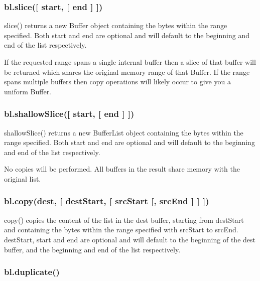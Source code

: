  \label{_slice}%
 \subsubsection*{bl.\+slice(\mbox{[} start, \mbox{[} end \mbox{]} \mbox{]})}

{\ttfamily slice()} returns a new {\ttfamily Buffer} object containing the bytes within the range specified. Both {\ttfamily start} and {\ttfamily end} are optional and will default to the beginning and end of the list respectively.

If the requested range spans a single internal buffer then a slice of that buffer will be returned which shares the original memory range of that Buffer. If the range spans multiple buffers then copy operations will likely occur to give you a uniform Buffer. 

 \label{_shallowSlice}%
 \subsubsection*{bl.\+shallow\+Slice(\mbox{[} start, \mbox{[} end \mbox{]} \mbox{]})}

{\ttfamily shallow\+Slice()} returns a new {\ttfamily Buffer\+List} object containing the bytes within the range specified. Both {\ttfamily start} and {\ttfamily end} are optional and will default to the beginning and end of the list respectively.

No copies will be performed. All buffers in the result share memory with the original list. 

 \label{_copy}%
 \subsubsection*{bl.\+copy(dest, \mbox{[} dest\+Start, \mbox{[} src\+Start \mbox{[}, src\+End \mbox{]} \mbox{]} \mbox{]})}

{\ttfamily copy()} copies the content of the list in the {\ttfamily dest} buffer, starting from {\ttfamily dest\+Start} and containing the bytes within the range specified with {\ttfamily src\+Start} to {\ttfamily src\+End}. {\ttfamily dest\+Start}, {\ttfamily start} and {\ttfamily end} are optional and will default to the beginning of the {\ttfamily dest} buffer, and the beginning and end of the list respectively. 

 \label{_duplicate}%
 \subsubsection*{bl.\+duplicate()}

